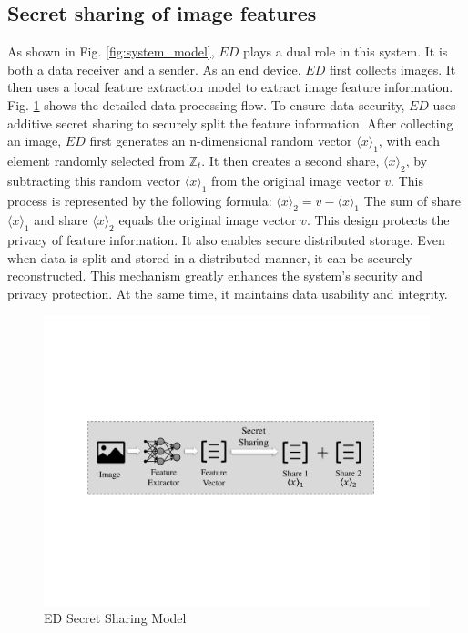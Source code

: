 \documentclass[conference]{IEEEtran}
\begin{document}
\subsection{Secret sharing of image features}

As shown in Fig. \ref{fig:system_model}, $ED$ plays a dual role in this system. It is both a data receiver and a sender. As an end device, $ED$ first collects images. It then uses a local feature extraction model to extract image feature information. Fig. \ref{fig:ED_Models} shows the detailed data processing flow. To ensure data security, $ED$ uses additive secret sharing to securely split the feature information. After collecting an image, $ED$ first generates an n-dimensional random vector $\langle x \rangle_1$, with each element randomly selected from $\mathbb{Z}_t$. It then creates a second share, $\langle x \rangle_2$, by subtracting this random vector $\langle x \rangle_1$ from the original image vector $v$. This process is represented by the following formula:
$\langle x \rangle_2 = v - \langle x \rangle_1$
The sum of share $\langle x \rangle_1$ and share $\langle x \rangle_2$ equals the original image vector $v$. This design protects the privacy of feature information. It also enables secure distributed storage. Even when data is split and stored in a distributed manner, it can be securely reconstructed. This mechanism greatly enhances the system's security and privacy protection. At the same time, it maintains data usability and integrity.

\begin{figure}[ht]
\includegraphics[width=1\linewidth]{fig2.pdf}
\caption{ED Secret Sharing Model} \label{fig:ED_Models}
\end{figure}
\end{document}
